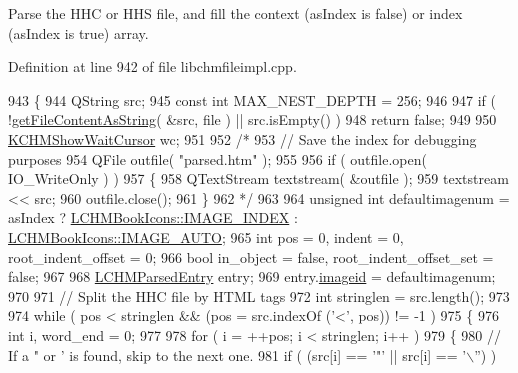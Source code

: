 Parse the H\+H\+C or H\+H\+S file, and fill the context (as\+Index is false) or index (as\+Index is true) array. 



Definition at line 942 of file libchmfileimpl.\+cpp.


\begin{DoxyCode}
943 \{
944     QString src;
945     \textcolor{keyword}{const} \textcolor{keywordtype}{int} MAX\_NEST\_DEPTH = 256;
946 
947     \textcolor{keywordflow}{if} ( !\hyperlink{classLCHMFileImpl_a4e0ea1a6ff803428299be6d72508c5c2}{getFileContentAsString}( &src, file ) || src.isEmpty() )
948         \textcolor{keywordflow}{return} \textcolor{keyword}{false};
949 
950     \hyperlink{classKCHMShowWaitCursor}{KCHMShowWaitCursor} wc;
951         
952 \textcolor{comment}{/*}
953 \textcolor{comment}{    // Save the index for debugging purposes}
954 \textcolor{comment}{    QFile outfile( "parsed.htm" );}
955 \textcolor{comment}{    }
956 \textcolor{comment}{    if ( outfile.open( IO\_WriteOnly ) )}
957 \textcolor{comment}{    \{}
958 \textcolor{comment}{        QTextStream textstream( &outfile );}
959 \textcolor{comment}{        textstream << src;}
960 \textcolor{comment}{        outfile.close();}
961 \textcolor{comment}{    \}}
962 \textcolor{comment}{*/}
963     
964     \textcolor{keywordtype}{unsigned} \textcolor{keywordtype}{int} defaultimagenum = asIndex ? \hyperlink{namespaceLCHMBookIcons_a53f976419fbc01639c4cd57090e11c2f}{LCHMBookIcons::IMAGE\_INDEX} : 
      \hyperlink{namespaceLCHMBookIcons_a0f3c670d267683e807f02d1cfa010518}{LCHMBookIcons::IMAGE\_AUTO};
965     \textcolor{keywordtype}{int} pos = 0, indent = 0, root\_indent\_offset = 0;
966     \textcolor{keywordtype}{bool} in\_object = \textcolor{keyword}{false}, root\_indent\_offset\_set = \textcolor{keyword}{false};
967     
968     \hyperlink{structLCHMParsedEntry}{LCHMParsedEntry} entry;
969     entry.\hyperlink{structLCHMParsedEntry_aefeb9372238ddebc327350e1696ec901}{imageid} = defaultimagenum;
970     
971     \textcolor{comment}{// Split the HHC file by HTML tags}
972     \textcolor{keywordtype}{int} stringlen = src.length();
973     
974     \textcolor{keywordflow}{while} ( pos < stringlen && (pos = src.indexOf (\textcolor{charliteral}{'<'}, pos)) != -1 )
975     \{
976         \textcolor{keywordtype}{int} i, word\_end = 0;
977         
978         \textcolor{keywordflow}{for} ( i = ++pos; i < stringlen; i++ )
979         \{
980             \textcolor{comment}{// If a " or ' is found, skip to the next one.}
981             \textcolor{keywordflow}{if} ( (src[i] == \textcolor{charliteral}{'"'} || src[i] == \textcolor{charliteral}{'\(\backslash\)''}) )

\end{DoxyCode}
